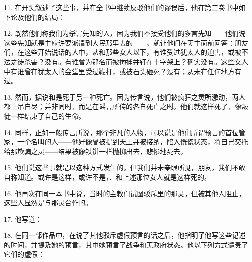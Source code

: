 11. 在开头叙述了这些事，并在全书中继续反驳他们的谬误后，他在第二卷书中如下论及他们的结局：\par

12. 既然他们称我们为杀害先知的人，因为我们不接受他们的多言先知——他们说这些先知就是主应许要派遣到人民那里去的——，就让他们在天主面前回答：朋友们，在这些开始说话的人中，从和那些女人以下，有谁受过犹太人的迫害，或被不法之徒杀害？没有。有谁曾为那名而被拘捕并钉在十字架上？确实没有。这些女人中有谁曾在犹太人的会堂里受过鞭打，或被石头砸死？没有；从未在任何地方有过。\par

13. 然而，据说和是死于另一种死亡。因为传言说，他们被疯狂之灵所激动，两人都上吊自尽；并非同时，而是在谣言所传的各自死亡之时。他们就这样死了，像叛徒一样结束了自己的生命。\par

14. 同样，正如一般传言所说，那个非凡的人物，可以说是他们所谓预言的首位管家，一个名叫的人——他好像曾被提到天上并被接纳，陷入恍惚状态，将自己交托给那欺骗之灵——结果被像铁饼一样抛掷出去，悲惨地死去。\par

15. 他们说这些事就是以这种方式发生的。但我们并未亲眼所见，朋友，我们不敢自称知道。或许是这样，或许不是，、和上述那位女人就是这样死的。\par

16. 他再次在同一本书中说，当时的主教们试图驳斥里的那灵，但被其他人阻止，这些人显然是与那灵合作的。\par

17. 他写道：\par

\par

18. 在同一部作品中，在说了其他驳斥虚假预言的话之后，他指明了他写这些记述的时间，并提及她的预言，其中她预言了战争和无政府状态。他以下列方式谴责了它们的虚假：\par

